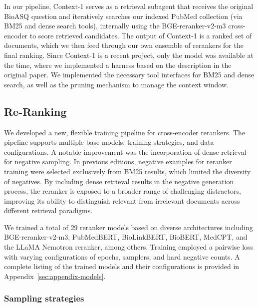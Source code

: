 In our pipeline, Context-1 serves as a retrieval subagent that receives the original BioASQ question and iteratively searches our indexed PubMed collection (via BM25 and dense search tools), internally using the BGE-reranker-v2-m3 cross-encoder to score retrieved candidates. The output of Context-1 is a ranked set of documents, which we then feed through our own ensemble of rerankers for the final ranking. Since Context-1 is a recent project, only the model was available at the time, where we implemented a harness based on the description in the original paper. We implemented the necessary tool interfaces for BM25 and dense search, as well as the pruning mechanism to manage the context window.

\subsection{Re-Ranking}
\label{sec:reranking}


We developed a new, flexible training pipeline for cross-encoder rerankers. The pipeline supports multiple base models, training strategies, and data configurations. A notable improvement was the incorporation of dense retrieval for negative sampling. In previous editions, negative examples for reranker training were selected exclusively from BM25 results, which limited the diversity of negatives. By including dense retrieval results in the negative generation process, the reranker is exposed to a broader range of challenging distractors, improving its ability to distinguish relevant from irrelevant documents across different retrieval paradigms.

We trained a total of 29 reranker models based on diverse architectures including BGE-reranker-v2-m3, PubMedBERT, BioLinkBERT, BioBERT, MedCPT, and the LLaMA Nemotron reranker, among others. Training employed a pairwise loss with varying configurations of epochs, samplers, and hard negative counts. A complete listing of the trained models and their configurations is provided in Appendix~\ref{sec:appendix-models}.

\subsubsection{Sampling strategies}

